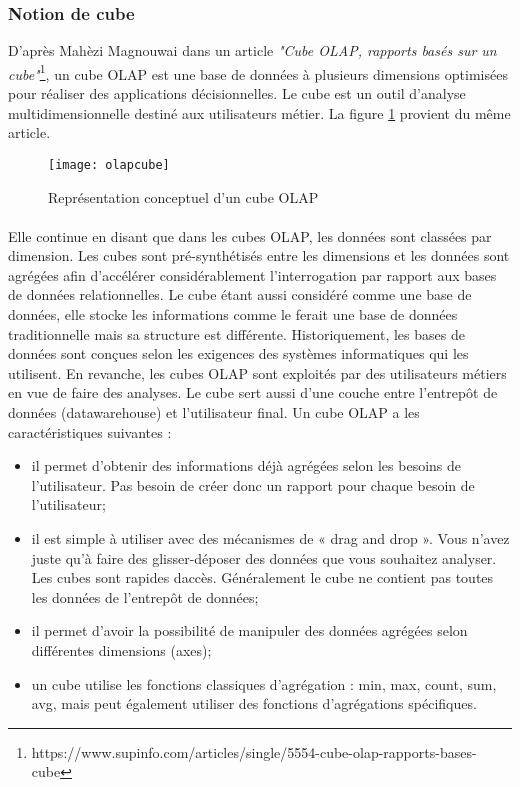 \subsubsection{Notion de cube}
D'après Mahèzi Magnouwai dans un article \textit{"Cube OLAP, rapports basés sur un cube"}\footnote{https://www.supinfo.com/articles/single/5554-cube-olap-rapports-bases-cube}, un cube OLAP est une base de données à plusieurs dimensions optimisées pour réaliser des applications décisionnelles. Le cube est un outil d’analyse multidimensionnelle destiné aux utilisateurs métier. La figure \ref{fig:olapcube} provient du même article.

\begin{figure}[H]
    \centering
    \texttt{[image: olapcube]}
    \caption{Représentation conceptuel d'un cube OLAP}
    \label{fig:olapcube}
\end{figure}

\paragraph{}
Elle continue en disant que dans les cubes OLAP, les données sont classées par dimension. Les cubes sont pré-synthétisés entre les dimensions et les données sont agrégées afin d’accélérer considérablement l’interrogation par rapport aux bases de données relationnelles. Le cube étant aussi considéré comme une base de données, elle stocke les informations comme le ferait une base de données traditionnelle mais sa structure est différente. Historiquement, les bases de données sont conçues selon les exigences des systèmes informatiques qui les utilisent. En revanche, les cubes OLAP sont exploités par des utilisateurs métiers en vue de faire des analyses. Le cube sert aussi d’une couche entre l’entrepôt de données (datawarehouse) et l’utilisateur final. Un cube OLAP a les caractéristiques suivantes :
\begin{itemize}
    \item il permet d’obtenir des informations déjà agrégées selon les besoins de l’utilisateur. Pas besoin de créer donc un rapport pour chaque besoin de l’utilisateur;
    \item il est simple à utiliser avec des mécanismes de « drag and drop ». Vous n’avez juste qu’à faire des glisser-déposer des données que vous souhaitez analyser. Les cubes sont rapides daccès. Généralement le cube ne contient pas toutes les données de l’entrepôt de données;
    \item il permet d'avoir la possibilité de manipuler des données agrégées selon différentes dimensions (axes);
    \item un cube utilise les fonctions classiques d’agrégation : min, max, count, sum, avg, mais peut également utiliser des fonctions d’agrégations spécifiques.
\end{itemize}
